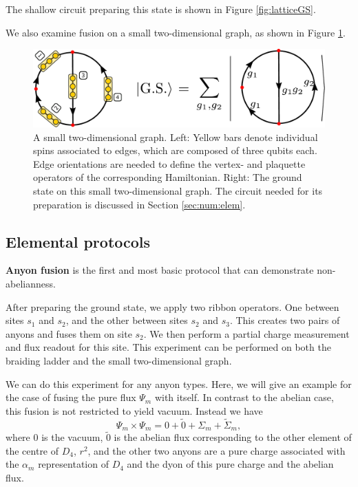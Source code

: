 \documentclass[a4paper,twocolumn,11pt]{quantumarticle}
\begin{document}
The shallow circuit preparing this state is shown in Figure \ref{fig:latticeGS}.

We also examine fusion on a small two-dimensional graph, as shown in Figure \ref{fig:basketball}.

\begin{figure}
    \centering
    \includegraphics[width=\linewidth]{Figures/basketball.pdf}
    \caption{A small two-dimensional graph. Left: Yellow bars denote individual spins associated to edges, which are composed of three qubits each. Edge orientations are needed to define the vertex- and plaquette operators of the corresponding Hamiltonian. Right: The ground state on this small two-dimensional graph. The circuit needed for its preparation is discussed in Section \ref{sec:num:elem}.}
    \label{fig:basketball}
\end{figure}




\subsection{Elemental protocols}
\textbf{Anyon fusion}
is the first and most basic protocol that can demonstrate non-abelianness. 

After preparing the ground state, we apply two ribbon operators. One between sites $s_1$ and $s_2$, and the other between sites $s_2$ and $s_3$.
This creates two pairs of anyons and fuses them on site $s_2$. We then perform a partial charge measurement and flux readout for this site.
This experiment can be performed on both the braiding ladder and the small two-dimensional graph.

We can do this experiment for any anyon types. Here, we will give an example for the case of fusing the pure flux $\Psi_m$ with itself. In contrast to the abelian case, this fusion is not restricted to yield vacuum. Instead we have
$$\Psi_m \times \Psi_m = 0 + \tilde{0} + \Sigma_m + \tilde{\Sigma}_m,$$ where $0$ is the vacuum, $\tilde{0}$ is the abelian flux corresponding to the other element of the centre of $D_4$, $r^2$, and the other two anyons are a pure charge associated with the $\alpha_m$ representation of $D_4$ and the dyon of this pure charge and the abelian flux.
\end{document}
